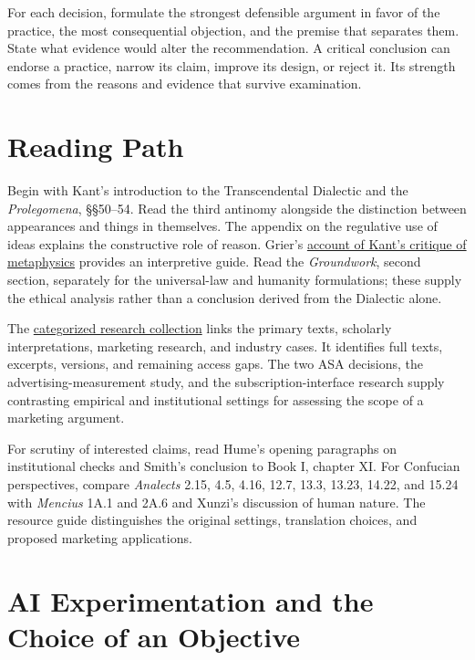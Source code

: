 For each decision, formulate the strongest defensible argument in favor
of the practice, the most consequential objection, and the premise that
separates them. State what evidence would alter the recommendation. A
critical conclusion can endorse a practice, narrow its claim, improve
its design, or reject it. Its strength comes from the reasons and
evidence that survive examination.


\hypertarget{M09-reading-path}{%
\section{Reading Path}\label{M09-reading-path}}

\noindent \noindent Begin with Kant's introduction to the Transcendental Dialectic
and the \emph{Prolegomena}, §§50--54. Read the third antinomy alongside
the distinction between appearances and things in themselves. The
appendix on the regulative use of ideas explains the constructive role
of reason. Grier's
\href{https://plato.stanford.edu/entries/kant-metaphysics/}{account of
Kant's critique of metaphysics} provides an interpretive guide. Read the
\emph{Groundwork}, second section, separately for the universal-law and
humanity formulations; these supply the ethical analysis rather than a
conclusion derived from the Dialectic alone.

The \href{../01_Resources/15_Marketing_Dialectics/README.md}{categorized
research collection} links the primary texts, scholarly interpretations,
marketing research, and industry cases. It identifies full texts,
excerpts, versions, and remaining access gaps. The two ASA decisions,
the advertising-measurement study, and the subscription-interface
research supply contrasting empirical and institutional settings for
assessing the scope of a marketing argument.

For scrutiny of interested claims, read Hume's opening paragraphs on
institutional checks and Smith's conclusion to Book I, chapter XI. For
Confucian perspectives, compare \emph{Analects} 2.15, 4.5, 4.16, 12.7,
13.3, 13.23, 14.22, and 15.24 with \emph{Mencius} 1A.1 and 2A.6 and
Xunzi's discussion of human nature. The resource guide distinguishes the
original settings, translation choices, and proposed marketing
applications.


\hypertarget{M09-ai-experimentation-and-the-choice-of-an-objective}{%
\section{AI Experimentation and the Choice of an
Objective}\label{M09-ai-experimentation-and-the-choice-of-an-objective}}

